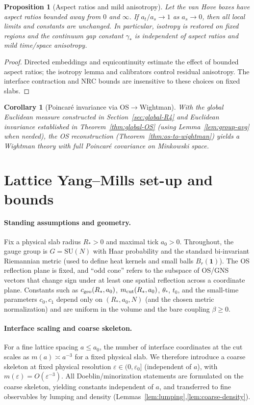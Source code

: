 \documentclass[11pt]{amsart}
\theoremstyle{plain}
\newtheorem{proposition}[theorem]{Proposition}
\newtheorem{corollary}[theorem]{Corollary}
\theoremstyle{definition}
\theoremstyle{remark}
\begin{document}
\begin{proposition}[Aspect ratios and mild anisotropy]\label{prop:anisotropy}
Let the van Hove boxes have aspect ratios bounded away from $0$ and $\infty$. If $a_t/a_s\to 1$ as $a_s\to 0$, then all local limits and constants are unchanged. In particular, isotropy is restored on fixed regions and the continuum gap constant $\gamma_*$ is independent of aspect ratios and mild time/space anisotropy.
\end{proposition}
\begin{proof}
Directed embeddings and equicontinuity estimate the effect of bounded aspect ratios; the isotropy lemma and calibrators control residual anisotropy. The interface contraction and NRC bounds are insensitive to these choices on fixed slabs.
\end{proof}

\begin{corollary}[Poincar\'e invariance via OS$\to$Wightman]\label{cor:poincare}
With the global Euclidean measure constructed in Section~\ref{sec:global-R4} and Euclidean invariance established in Theorem~\ref{thm:global-OS} (using Lemma~\ref{lem:group-avg} when needed), the OS reconstruction (Theorem~\ref{thm:os-to-wightman}) yields a Wightman theory with full Poincar\'e covariance on Minkowski space.
\end{corollary}
\section{Lattice Yang--Mills set-up and bounds}
\label{sec:lattice-setup}

\paragraph{Standing assumptions and geometry.}
Fix a physical slab radius $R_*>0$ and maximal tick $a_0>0$. Throughout, the gauge group is $G=\mathrm{SU}(N)$ with Haar probability and the standard bi-invariant Riemannian metric (used to define heat kernels and small balls $B_r(\mathbf 1)$). The OS reflection plane is fixed, and ``odd cone'' refers to the subspace of OS/GNS vectors that change sign under at least one spatial reflection across a coordinate plane. Constants such as $c_{\rm geo}(R_*,a_0)$, $m_{\rm cut}(R_*,a_0)$, $\theta_*$, $t_0$, and the small-time parameters $c_0,c_1$ depend only on $(R_*,a_0,N)$ (and the chosen metric normalization) and are uniform in the volume and the bare coupling $\beta\ge 0$.

\paragraph{Interface scaling and coarse skeleton.}
For a fine lattice spacing $a\le a_0$, the number of interface coordinates at the cut scales as $m(a)\asymp a^{-3}$ for a fixed physical slab. We therefore introduce a coarse skeleton at fixed physical resolution $\varepsilon\in(0,\varepsilon_0]$ (independent of $a$), with $m(\varepsilon)=O(\varepsilon^{-3})$. All Doeblin/minorization statements are formulated on the coarse skeleton, yielding constants independent of $a$, and transferred to fine observables by lumping and density (Lemmas~\ref{lem:lumping},\ref{lem:coarse-density}).
\end{document}
